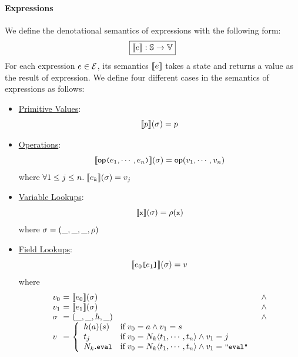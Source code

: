 \paragraph{Expressions} We define the denotational semantics of expressions with
the following form:
\[
  \framebox{$\sem{\expr}: \stset \rightarrow \valset$}
\]
For each expression $e \in \mathcal{E}$, its semantics $\llbracket{e}\rrbracket$ takes a
state and returns a value as the result of expression. We define four different
cases in the semantics of expressions as
follows:
\begin{itemize}
  \item \underline{Primitive Values}:
    \[
      \llbracket{p}\rrbracket(\sigma) = p
    \]

  \item \underline{Operations}:
    \[
      \llbracket{\textsf{op}{\small \texttt{(}}e_1, \cdots, e_n {\small \texttt{)}}}\rrbracket(\sigma) =
      \textsf{op}(v_1, \cdots, v_n)
    \]
    where $\forall 1 \leq j \leq n. \; \llbracket{e_k}\rrbracket(\sigma) = v_j$

  \item \underline{Variable Lookups}:
    \[
      \llbracket{{\small \texttt{x}}}\rrbracket(\sigma) = \rho({\small \texttt{x}})
    \]
    where $\sigma = (\_, \_, \_, \rho)$

  \item \underline{Field Lookups}:
    \[
      \llbracket{e_0 {\small \texttt{[}}e_1 {\small \texttt{]}}}\rrbracket(\sigma) = v
    \]
    where
    \[
      \begin{array}{l@{~}c@{~}ll}
        \val_0 &=& \sem{\expr_0}(\st) &\wedge\\
        \val_1 &=& \sem{\expr_1}(\st) &\wedge\\
        \st &=& (\_, \_, \heap, \_) &\wedge\\
        \val &=& \left\{
          \begin{array}{ll}
            \heap(\addr)(\str)
            & \text{if} \; \val_0 = \addr \wedge \val_1 = \str\\

            \tree_j
            & \text{if} \; \val_0 = \nt_k \langle \tree_1, \cdots, \tree_n
            \rangle \wedge \val_1 = j\\

            \nt_k.\eval
            & \text{if} \; \val_0 = \nt_k \langle \tree_1, \cdots, \tree_n
            \rangle \wedge \val_1 = \code{"eval"}\\
          \end{array}
        \right.\\
      \end{array}
    \]
\end{itemize}


